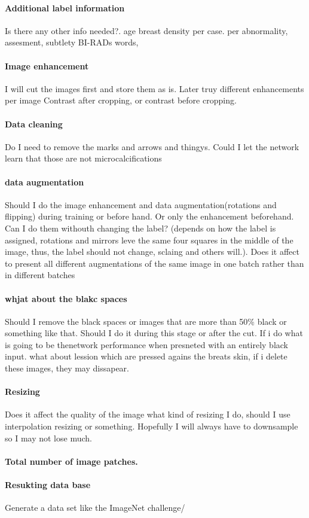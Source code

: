 \paragraph{Additional label information}
Is there any other info needed?. age breast density per case. per abnormality, assesment, subtlety BI-RADs words,  

\paragraph{Image enhancement}
I will cut the images first and store them as is. Later truy different enhancements per image
Contrast after cropping, or contrast before cropping.
\paragraph{Data cleaning}
Do I need to remove the marks and arrows and thingys. Could I let the network learn that those are not microcalcifications

\paragraph{data augmentation}
Should I do the image enhancement and data augmentation(rotations and flipping) during training or before hand. Or only the enhancement beforehand. Can I do them withouth changing the label? (depends on how the label is assigned, rotations and mirrors leve the same four squares in the middle of the image, thus, the label should not change, sclaing and others will.). Does it affect to present all different augmentations of the same image in one batch rather than in different batches

\paragraph{whjat about the blakc spaces}
Should I remove the black spaces or images that are more than 50\% black or something like that. Should I do it during this stage or after the cut. If i do what is going to be thenetwork performance when presneted with an entirely black input. what about lession which are pressed agains the breats skin, if i delete these images, they may dissapear.

\paragraph{Resizing}
Does it affect the quality of the image what kind of resizing I do, should I use interpolation resizing or something. Hopefully I will always have to downsample so I may not lose much.

\paragraph{Total number of image patches.}

\paragraph{Resukting data base}
Generate a data set like the ImageNet challenge/

